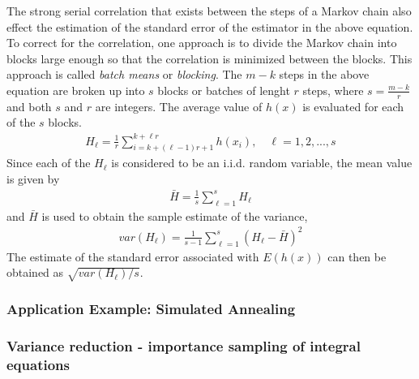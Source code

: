 \documentclass[twoside,english]{uiofysmaster}
\begin{document}
The strong serial correlation that exists between the steps of a Markov chain also effect the estimation of the standard error of the estimator in the above equation. To correct for the correlation, one approach is to divide the Markov chain into blocks large enough so that the correlation is minimized between the blocks. This approach is called \textit{batch means} or \textit{blocking}. The $m-k$ steps in the above equation are broken up into $s$ blocks or batches of lenght $r$ steps, where $s = \frac{m-k}{r}$ and both $s$ and $r$ are integers. The average value of $h(x)$ is evaluated for each of the $s$ blocks.
\begin{align}
	H_{\mathit{\ell}} = \frac{1}{r} \sum_{i=k+(\ell - 1)r + 1}^{k + \ell r} h(x_i), \quad \ell = 1,2,...,s
\end{align}
Since each of the $H_\ell$ is considered to be an i.i.d. random variable, the mean value is given by 
\begin{align}
	\bar{H} = \frac{1}{s} \sum_{\ell = 1}^s H_\ell
\end{align}
and $\bar{H}$ is used to obtain the sample estimate of the variance,
\begin{align}
	var(H_\ell) = \frac{1}{s-1} \sum_{\ell = 1}^s (H_\ell - \bar{H})^2
\end{align}
The estimate of the standard error associated with $E(h(x))$ can then be obtained as $\sqrt{var(H_\ell)/s}$. 
 \cite{Kalos2008}
\subsubsection{Application Example: Simulated Annealing}
 \cite{Kalos2008}
\subsubsection{Variance reduction - importance sampling of integral equations}
 \cite{Kalos2008}
\end{document}
